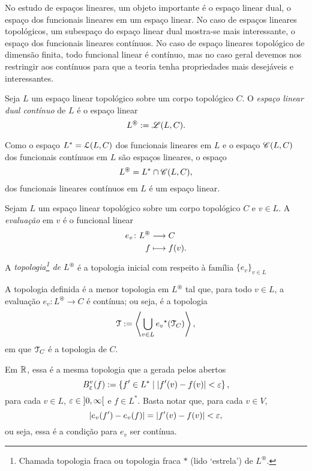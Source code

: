 No estudo de espaços lineares, um objeto importante é o espaço linear dual, o espaço dos funcionais lineares em um espaço linear. No caso de espaços lineares topológicos, um subespaço do espaço linear dual mostra-se mais interessante, o espaço dos funcionais lineares contínuos. No caso de espaço lineares topológico de dimensão finita, todo funcional linear é contínuo, mas no caso geral devemos nos restringir aos contínuos para que a teoria tenha propriedades mais desejáveis e interessantes.

\begin{definition}
Seja $L$ um espaço linear topológico sobre um corpo topológico $C$. O \emph{espaço linear dual contínuo} de $L$ é o espaço linear
	\begin{equation*}
	L^\circledast := \mathscr{L}(L,C).
	\end{equation*}
\end{definition}

Como o espaço $L^* = \mathcal{L}(L,C)$ dos funcionais lineares em $L$ e o espaço $\mathscr{C}(L,C)$ dos funcionais contínuos em $L$ são espaços lineares, o espaço
	\begin{equation*}
	L^\circledast = L^* \cap \mathscr{C}(L,C),
	\end{equation*}
dos funcionais lineares contínuos em $L$ é um espaço linear.

\begin{definition}
Sejam $L$ um espaço linear topológico sobre um corpo topológico $C$ e $v \in L$. A \emph{evaluação} em $v$ é o funcional linear
	\begin{align*}
	{e_v}\colon {L^\circledast} &\longrightarrow {C} \\{f} &\longmapsto f(v).
	\end{align*}
A \emph{topologia\footnote{Chamada topologia fraca ou topologia fraca $*$ (lido `estrela') de $L^\circledast$.} de $L^\circledast$} é a topologia inicial com respeito à família $\{e_v\}_{v \in L}$
\end{definition}

A topologia definida é a menor topologia em $L^\circledast$ tal que, para todo $v \in L$, a evaluação $e_v\colon L^\circledast \to C$ é contínua; ou seja, é a topologia
	\begin{equation*}
	\mathcal{T} := \left\langle \bigcup_{v \in L} {e_v}^\star(\mathcal{T}_C) \right\rangle,
	\end{equation*}
em que $\mathcal{T}_C$ é a topologia de $C$.

Em $\mathbb{R}$, essa é a mesma topologia que a gerada pelos abertos
	\begin{equation*}
	B^v_\varepsilon(f) := \left\{{f' \in L^*}\;\middle\vert\;{\left\vert{f'(v)-f(v)}\right\vert < \varepsilon}\right\},
	\end{equation*}
para cada $v \in L$, $\varepsilon \in \left]{0},{\infty}\right[$ e $f \in L^*$. Basta notar que, para cada $v \in V$,
	\begin{equation*}
	\left\vert{e_v(f') - e_v(f)}\right\vert = \left\vert{f'(v)-f(v)}\right\vert < \varepsilon,
	\end{equation*}
ou seja, essa é a condição para $e_v$ ser contínua.




